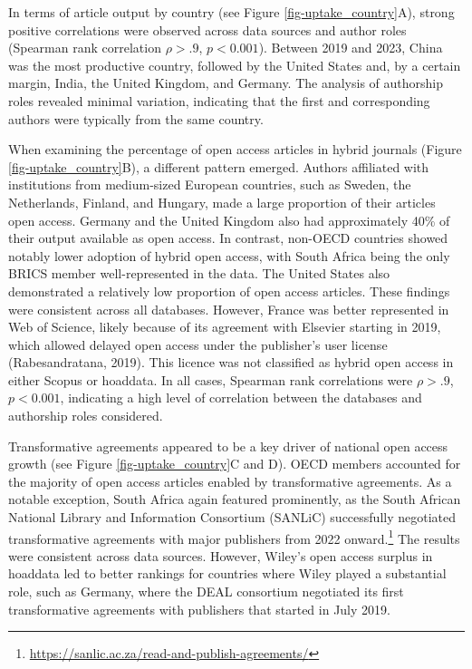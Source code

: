 \documentclass[a4paper,man,floatsintext,longtable,noextraspace,10pt]{apa6}
\begin{document}
In terms of article output by country (see Figure
\ref{fig-uptake_country}A), strong positive correlations were observed
across data sources and author roles (Spearman rank correlation
\(\rho > .9\), \(p < 0.001\)). Between 2019 and 2023, China was the most
productive country, followed by the United States and, by a certain
margin, India, the United Kingdom, and Germany. The analysis of
authorship roles revealed minimal variation, indicating that the first
and corresponding authors were typically from the same country.

When examining the percentage of open access articles in hybrid journals
(Figure \ref{fig-uptake_country}B), a different pattern emerged. Authors
affiliated with institutions from medium-sized European countries, such
as Sweden, the Netherlands, Finland, and Hungary, made a large
proportion of their articles open access. Germany and the United Kingdom
also had approximately 40\% of their output available as open access. In
contrast, non-OECD countries showed notably lower adoption of hybrid
open access, with South Africa being the only BRICS member
well-represented in the data. The United States also demonstrated a
relatively low proportion of open access articles. These findings were
consistent across all databases. However, France was better represented
in Web of Science, likely because of its agreement with Elsevier
starting in 2019, which allowed delayed open access under the
publisher's user license (Rabesandratana, 2019). This licence was not
classified as hybrid open access in either Scopus or hoaddata. In all
cases, Spearman rank correlations were \(\rho > .9\), \(p < 0.001\),
indicating a high level of correlation between the databases and
authorship roles considered.

Transformative agreements appeared to be a key driver of national open
access growth (see Figure \ref{fig-uptake_country}C and D). OECD members
accounted for the majority of open access articles enabled by
transformative agreements. As a notable exception, South Africa again
featured prominently, as the South African National Library and
Information Consortium (SANLiC) successfully negotiated transformative
agreements with major publishers from 2022 onward.\footnote{\url{https://sanlic.ac.za/read-and-publish-agreements/}}
The results were consistent across data sources. However, Wiley's open
access surplus in hoaddata led to better rankings for countries where
Wiley played a substantial role, such as Germany, where the DEAL
consortium negotiated its first transformative agreements with
publishers that started in July 2019.
\end{document}
